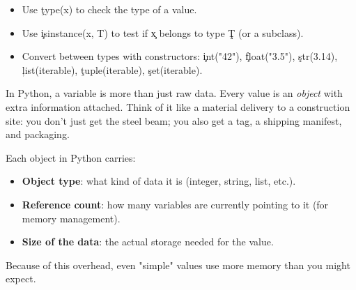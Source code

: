 \begin{itemize}
    \item Use \c{type(x)} to check the type of a value.
    \item Use \c{isinstance(x, T)} to test if \c{x} belongs to type \c{T} (or a subclass).
    \item Convert between types with constructors: \c{int("42")}, \c{float("3.5")}, \c{str(3.14)}, \c{list(iterable)}, \c{tuple(iterable)}, \c{set(iterable)}.
\end{itemize}



In Python, a variable is more than just raw data. Every value is an \emph{object} with extra information attached.  
Think of it like a material delivery to a construction site: you don't just get the steel beam; you also get a tag, a shipping manifest, and packaging.  

Each object in Python carries:
\begin{itemize}
  \item \textbf{Object type}: what kind of data it is (integer, string, list, etc.).
  \item \textbf{Reference count}: how many variables are currently pointing to it (for memory management).
  \item \textbf{Size of the data}: the actual storage needed for the value.
\end{itemize}

Because of this overhead, even "simple" values use more memory than you might expect.  


